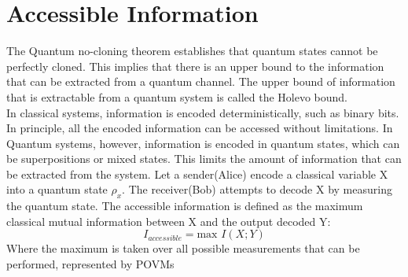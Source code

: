 \section{Accessible Information}
The Quantum no-cloning theorem establishes that quantum states cannot be perfectly cloned. This implies that there is an upper bound to the information that can be extracted from a quantum channel. The upper bound of information that is extractable from a quantum system is called the Holevo bound.\\
In classical systems, information is encoded deterministically, such as binary bits. In principle, all the encoded information can be accessed without limitations. In Quantum systems, however, information is encoded in quantum states, which can be superpositions or mixed states. This limits the amount of information that can be extracted from the system.
\newline
Let a sender(Alice) encode a classical variable X into a quantum state $\rho_x$. The receiver(Bob) attempts to decode X by measuring the quantum state. The accessible information is defined as the maximum classical mutual information between X and the output decoded Y:
\[
I_{accessible} = \text{max } I(X;Y)
\]
Where the maximum is taken over all possible measurements that can  be performed, represented by POVMs
